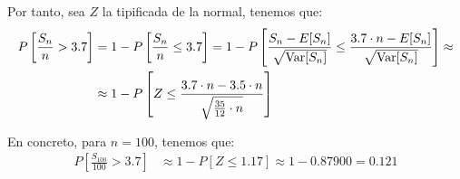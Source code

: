 \begin{ejercicio}
    Por tanto, sea $Z$ la tipificada de la normal, tenemos que:
    \begin{align*}
        P\left[\frac{S_{n}}{n} > 3.7\right] &= 1 - P\left[\frac{S_{n}}{n} \leq 3.7\right]
        = 1 - P\left[\frac{S_{n}-E[S_n]}{\sqrt{\operatorname{Var}[S_{n}]}} \leq \frac{3.7 \cdot n - E[S_n]}{\sqrt{\operatorname{Var}[S_{n}]}}\right]
        \approx\\&\approx 1 - P\left[Z \leq \frac{3.7 \cdot n - 3.5\cdot n}{\sqrt{\frac{35}{12}\cdot n}}\right]
    \end{align*}

    En concreto, para $n=100$, tenemos que:
    \begin{align*}
        P\left[\frac{S_{100}}{100} > 3.7\right] &\approx 1 - P\left[Z \leq 1.17\right]
        \approx 1 - 0.87900 = 0.121
    \end{align*}
\end{ejercicio}


